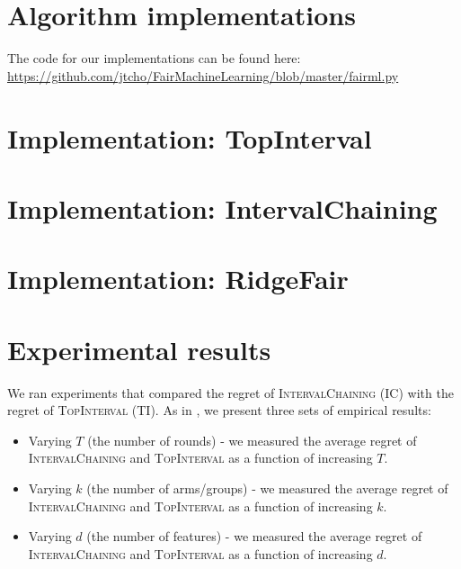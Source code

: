 \documentclass[11pt]{article}
\begin{document}
\section{Algorithm implementations}

The code for our implementations can be found here: \url{https://github.com/jtcho/FairMachineLearning/blob/master/fairml.py}

\section{Implementation: TopInterval}

\section{Implementation: IntervalChaining}

\section{Implementation: RidgeFair}

\section{Experimental results}

We ran experiments that compared the regret of \textsc{IntervalChaining} (IC) with the regret of \textsc{TopInterval} (TI). As in , we present three sets of empirical results: 
\begin{itemize}
	\item Varying $T$ (the number of rounds) - we measured the average regret of \textsc{IntervalChaining} and \textsc{TopInterval} as a function of increasing $T$.
	\item Varying $k$ (the number of arms/groups) - we measured the average regret of \textsc{IntervalChaining} and \textsc{TopInterval} as a function of increasing $k$.
	\item Varying $d$ (the number of features) - we measured the average regret of \textsc{IntervalChaining} and \textsc{TopInterval} as a function of increasing $d$.
\end{itemize} 
\end{document}
